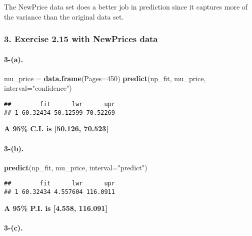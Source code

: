 \documentclass[]{article}
\newenvironment{Shaded}{\begin{snugshade}}{\end{snugshade}}
\newcommand{\KeywordTok}[1]{\textcolor[rgb]{0.13,0.29,0.53}{\textbf{{#1}}}}
\newcommand{\DataTypeTok}[1]{\textcolor[rgb]{0.13,0.29,0.53}{{#1}}}
\newcommand{\DecValTok}[1]{\textcolor[rgb]{0.00,0.00,0.81}{{#1}}}
\newcommand{\StringTok}[1]{\textcolor[rgb]{0.31,0.60,0.02}{{#1}}}
\newcommand{\NormalTok}[1]{{#1}}
\let\oldparagraph\paragraph
\renewcommand{\paragraph}[1]{\oldparagraph{#1}\mbox{}}
\begin{document}
The NewPrice data set does a better job in prediction since it captures
more of the variance than the original data set.

\subsubsection{3. Exercise 2.15 with NewPrices
data}\label{exercise-2.15-with-newprices-data}

\paragraph{3-(a).}\label{a.-1}

\begin{Shaded}
\begin{Highlighting}[]
\NormalTok{mu_price =}\StringTok{ }\KeywordTok{data.frame}\NormalTok{(}\DataTypeTok{Pages=}\DecValTok{450}\NormalTok{)}
\KeywordTok{predict}\NormalTok{(np_fit, mu_price, }\DataTypeTok{interval=}\StringTok{"confidence"}\NormalTok{)}
\end{Highlighting}
\end{Shaded}

\begin{verbatim}
##        fit      lwr      upr
## 1 60.32434 50.12599 70.52269
\end{verbatim}

\textbf{A 95\% C.I. is {[}50.126, 70.523{]}}

\paragraph{3-(b).}\label{b.-2}

\begin{Shaded}
\begin{Highlighting}[]
\KeywordTok{predict}\NormalTok{(np_fit, mu_price, }\DataTypeTok{interval=}\StringTok{"predict"}\NormalTok{)}
\end{Highlighting}
\end{Shaded}

\begin{verbatim}
##        fit      lwr      upr
## 1 60.32434 4.557604 116.0911
\end{verbatim}

\textbf{A 95\% P.I. is {[}4.558, 116.091{]}}

\paragraph{3-(c).}\label{c.}
\end{document}
